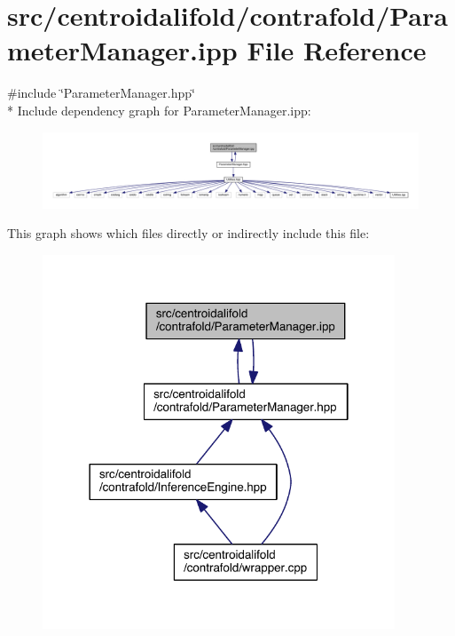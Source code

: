 \hypertarget{centroidalifold_2contrafold_2_parameter_manager_8ipp}{\section{src/centroidalifold/contrafold/\+Parameter\+Manager.ipp File Reference}
\label{centroidalifold_2contrafold_2_parameter_manager_8ipp}
}
{\ttfamily \#include \char`\"{}Parameter\+Manager.\+hpp\char`\"{}}\\*
Include dependency graph for Parameter\+Manager.\+ipp\+:
\nopagebreak
\begin{figure}[H]
\begin{center}
\leavevmode
\includegraphics[width=350pt]{centroidalifold_2contrafold_2_parameter_manager_8ipp__incl}
\end{center}
\end{figure}
This graph shows which files directly or indirectly include this file\+:
\nopagebreak
\begin{figure}[H]
\begin{center}
\leavevmode
\includegraphics[width=298pt]{centroidalifold_2contrafold_2_parameter_manager_8ipp__dep__incl}
\end{center}
\end{figure}
